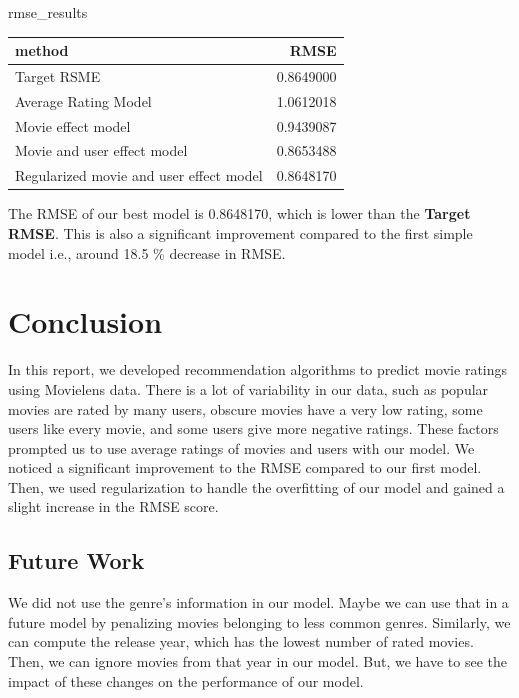 \documentclass[]{article}
\newenvironment{Shaded}{\begin{snugshade}}{\end{snugshade}}
\newcommand{\NormalTok}[1]{#1}
\begin{document}
\begin{Shaded}
\begin{Highlighting}[]
\NormalTok{rmse_results}
\end{Highlighting}
\end{Shaded}

\begin{longtable}[]{@{}lr@{}}
\toprule
method & RMSE\tabularnewline
\midrule
\endhead
Target RSME & 0.8649000\tabularnewline
Average Rating Model & 1.0612018\tabularnewline
Movie effect model & 0.9439087\tabularnewline
Movie and user effect model & 0.8653488\tabularnewline
Regularized movie and user effect model & 0.8648170\tabularnewline
\bottomrule
\end{longtable}

The RMSE of our best model is 0.8648170, which is lower than the
\textbf{Target RMSE}. This is also a significant improvement compared to
the first simple model i.e., around 18.5 \% decrease in RMSE.

\section{Conclusion}
\label{sec:conclusion}

In this report, we developed recommendation algorithms to predict movie
ratings using Movielens data. There is a lot of variability in our data,
such as popular movies are rated by many users, obscure movies have a
very low rating, some users like every movie, and some users give more
negative ratings. These factors prompted us to use average ratings of
movies and users with our model. We noticed a significant improvement to
the RMSE compared to our first model. Then, we used regularization to
handle the overfitting of our model and gained a slight increase in the
RMSE score.

\subsection{Future Work}
\label{sec:futurework}

We did not use the genre's information in our model. Maybe we can use
that in a future model by penalizing movies belonging to less common
genres. Similarly, we can compute the release year, which has the lowest
number of rated movies. Then, we can ignore movies from that year in our
model. But, we have to see the impact of these changes on the
performance of our model.
\end{document}
